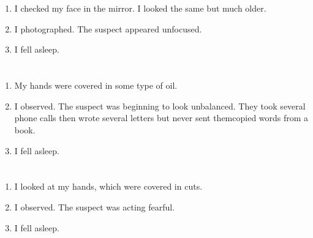 \documentclass{article}
\begin{document}
    \newpage
    
    \section{}
    
    \begin{enumerate}
    
    \item I checked my face in the mirror. I looked the same but much older.\\
    
    \item I photographed. The suspect appeared unfocused.\\
    
    \item I fell asleep.\\
    
    \end{enumerate}
     
    \newpage
    
    \section{}
    
    \begin{enumerate}
    
    \item My hands were covered in some type of oil.\\
    
    \item I observed. The suspect was beginning to look unbalanced. They took several phone calls then wrote several letters but never sent themcopied words from a book.\\
    
    \item I fell asleep.\\
    
    \end{enumerate}
     
    \newpage
    
    \section{}
    
    \begin{enumerate}
    
    \item I looked at my hands, which were covered in cuts.\\
    
    \item I observed. The suspect was acting fearful.\\
    
    \item I fell asleep.\\
    
    \end{enumerate}
     
\end{document}
